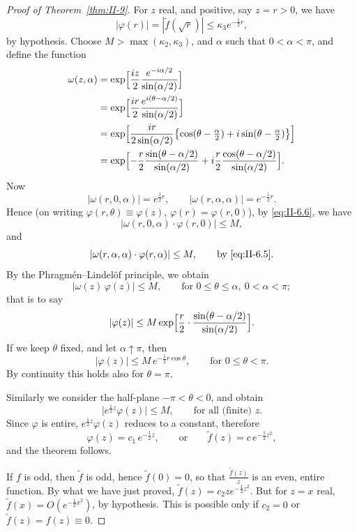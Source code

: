 \begin{proof}[Proof of Theorem~\ref{thm:II-9}]
For $z$ real, and positive, say $z=r>0$, we have
\begin{equation}\tag{6.6}\label{eq:II-6.6}
|\varphi(r)|=|\tilde f(\sqrt{r})|\le\kappa_{3}e^{-\frac{1}{2}r},
\end{equation}
by hypothesis. Choose $M>\max(\kappa_{2},\kappa_{3})$, and $\alpha$ such that $0<\alpha<\pi$, and define the function
\[
\begin{aligned}
\omega(z,\alpha) &= \exp\Bigl[\frac{iz}{2}\frac{e^{-i\alpha/2}}{\sin(\alpha/2)}\Bigr]\\
&= \exp\Bigl[\frac{ir}{2}\frac{e^{i(\theta-\alpha/2)}}{\sin(\alpha/2)}\Bigr]\\
&= \exp\Bigl[\frac{ir}{2\sin(\alpha/2)}\bigl\{\cos(\theta-\tfrac{\alpha}{2})+i\sin(\theta-\tfrac{\alpha}{2})\bigr\}\Bigr]\\
&= \exp\Bigl[-\frac{r}{2}\frac{\sin(\theta-\alpha/2)}{\sin(\alpha/2)}+i\frac{r}{2}\frac{\cos(\theta-\alpha/2)}{\sin(\alpha/2)}\Bigr].
\end{aligned}
\]
Now
\[
|\omega(r,0,\alpha)|=e^{\frac{1}{2}r},\qquad |\omega(r,\alpha,\alpha)|=e^{-\frac{1}{2}r}.
\]
Hence (on writing $\varphi(r,\theta)\equiv\varphi(z)$, $\varphi(r)=\varphi(r,0)$), by \eqref{eq:II-6.6}, we have
\[
|\omega(r,0,\alpha)\cdot\varphi(r,0)|\le M,
\]
and
\[
|\omega(r,\alpha,\alpha)\cdot\varphi(r,\alpha)|\le M,\qquad\text{by \eqref{eq:II-6.5}}.
\]
By the Phragm\'en--Lindel\"of principle, we obtain
\[
|\omega(z)\,\varphi(z)|\le M,\qquad\text{for }0\le\theta\le\alpha,\ 0<\alpha<\pi;
\]
that is to say
\[
|\varphi(z)|\le M\exp\Bigl[\frac{r}{2}\cdot\frac{\sin(\theta-\alpha/2)}{\sin(\alpha/2)}\Bigr].
\]
If we keep $\theta$ fixed, and let $\alpha\uparrow\pi$, then
\[
|\varphi(z)|\le M\,e^{-\frac{1}{2}r\cos\theta},\qquad\text{for }0\le\theta<\pi.
\]
By continuity this holds also for $\theta=\pi$.

Similarly we consider the half-plane $-\pi<\theta<0$, and obtain
\[
\bigl|e^{\frac{1}{2}z}\varphi(z)\bigr|\le M,\qquad\text{for all (finite) }z.
\]
Since $\varphi$ is entire, $e^{\frac{1}{2}z}\varphi(z)$ reduces to a constant, therefore
\[
\varphi(z)=c_{1}\,e^{-\frac{1}{2}z},\qquad\text{or}\qquad \tilde f(z)=c\,e^{-\frac{1}{2}z^{2}},
\]
and the theorem follows.

If $f$ is odd, then $\tilde f$ is odd, hence $\tilde f(0)=0$, so that $\frac{\tilde f(z)}{z}$ is an even, entire function. By what we have just proved, $\tilde f(z)=c_{2}z e^{-\frac{1}{2}z^{2}}$. But for $z=x$ real, $\tilde f(x)=O(e^{-\frac{1}{2}x^{2}})$, by hypothesis. This is possible only if $c_{2}=0$ or $\tilde f(z)=f(z)\equiv 0$.
\end{proof}

